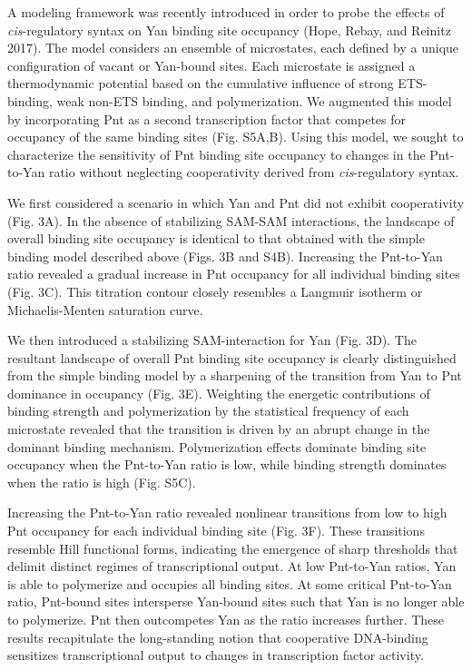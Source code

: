 A modeling framework was recently introduced in order to probe the effects of \emph{cis}-regulatory syntax on Yan binding site occupancy (Hope, Rebay, and Reinitz 2017). The model considers an ensemble of microstates, each defined by a unique configuration of vacant or Yan-bound sites. Each microstate is assigned a thermodynamic potential based on the cumulative influence of strong ETS-binding, weak non-ETS binding, and polymerization. We augmented this model by incorporating Pnt as a second transcription factor that competes for occupancy of the same binding sites (Fig. S5A,B). Using this model, we sought to characterize the sensitivity of Pnt binding site occupancy to changes in the Pnt-to-Yan ratio without neglecting cooperativity derived from \emph{cis}-regulatory syntax.

We first considered a scenario in which Yan and Pnt did not exhibit cooperativity (Fig. 3A). In the absence of stabilizing SAM-SAM interactions, the landscape of overall binding site occupancy is identical to that obtained with the simple binding model described above (Figs. 3B and S4B). Increasing the Pnt-to-Yan ratio revealed a gradual increase in Pnt occupancy for all individual binding sites (Fig. 3C). This titration contour closely resembles a Langmuir isotherm or Michaelis-Menten saturation curve.

We then introduced a stabilizing SAM-interaction for Yan (Fig. 3D). The resultant landscape of overall Pnt binding site occupancy is clearly distinguished from the simple binding model by a sharpening of the transition from Yan to Pnt dominance in occupancy (Fig. 3E). Weighting the energetic contributions of binding strength and polymerization by the statistical frequency of each microstate revealed that the transition is driven by an abrupt change in the dominant binding mechanism. Polymerization effects dominate binding site occupancy when the Pnt-to-Yan ratio is low, while binding strength dominates when the ratio is high (Fig. S5C).

Increasing the Pnt-to-Yan ratio revealed nonlinear transitions from low to high Pnt occupancy for each individual binding site (Fig. 3F). These transitions resemble Hill functional forms, indicating the emergence of sharp thresholds that delimit distinct regimes of transcriptional output. At low Pnt-to-Yan ratios, Yan is able to polymerize and occupies all binding sites. At some critical Pnt-to-Yan ratio, Pnt-bound sites intersperse Yan-bound sites such that Yan is no longer able to polymerize. Pnt then outcompetes Yan as the ratio increases further. These results recapitulate the long-standing notion that cooperative DNA-binding sensitizes transcriptional output to changes in transcription factor activity.

